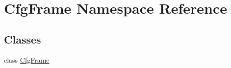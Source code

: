 \hypertarget{namespaceCfgFrame}{}\section{Cfg\+Frame Namespace Reference}
\label{namespaceCfgFrame}
\subsection*{Classes}
\begin{DoxyCompactItemize}
\item 
class \hyperlink{classCfgFrame_1_1CfgFrame}{Cfg\+Frame}
\end{DoxyCompactItemize}
